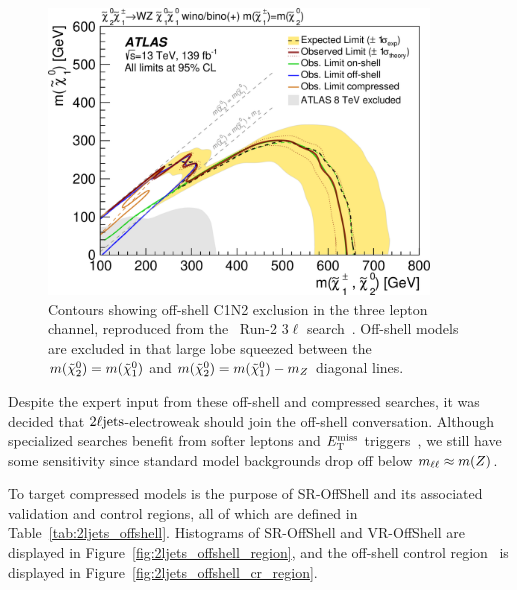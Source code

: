 \begin{figure}[tp]
\centering
\includegraphics[width=0.9\textwidth]{figures/2ljets_compressed_3l_ins1866951_fig_16a.png}
\caption[
Contours showing off-shell C1N2 exclusion from the \atlas\ Run-2 $3\ell$ search
]{%
Contours showing off-shell C1N2 exclusion in the three lepton channel,
reproduced from the \atlas\ Run-2 $3\ell$
search~\cite{atlas_rjr_3l_SUSY_2019_09, hepdata.95751}.
Off-shell models are excluded in that large lobe squeezed between the
$m(\tilde\chi^0_2) = m(\tilde\chi^0_1)$ and
$m(\tilde\chi^0_2) = m(\tilde\chi^0_1) - m_Z$ diagonal lines.
}
\label{fig:ljets_offshell_3l_exclusion}
\end{figure}

Despite the expert input from these off-shell and compressed searches, it was
decided that $2\ell\mathrm{jets}$-electroweak should join the off-shell
conversation.
Although specialized searches benefit from softer leptons and $E_\mathrm{T}^\mathrm{miss}$
triggers~\cite{atlas_susy_compressed_2l_2018_run2},
we still have some sensitivity since standard model backgrounds drop off
below $m_{\ell\ell} \approx m(Z)$.

To target compressed models is the purpose of SR-OffShell and its associated
validation and control regions, all of which are defined in
Table~\ref{tab:2ljets_offshell}.
Histograms of SR-OffShell and VR-OffShell are displayed in
Figure~\ref{fig:2ljets_offshell_region}, and the off-shell control region
\crdy\ is displayed in Figure~\ref{fig:2ljets_offshell_cr_region}.

